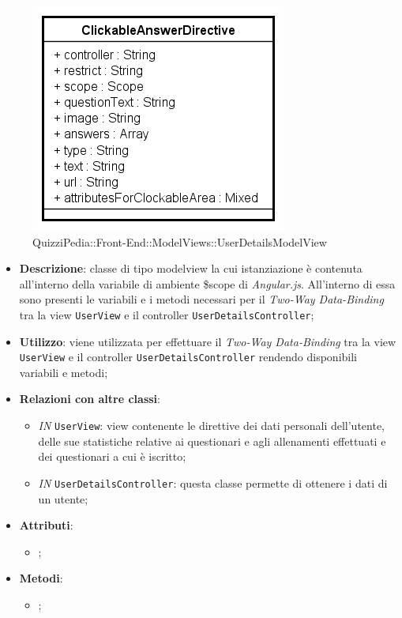 		\begin{figure}[ht]
			\centering
			\includegraphics[scale=0.5,keepaspectratio]{UML/Classi/Front-End/QuizziPedia_Front-end_Templates_ClickableAnswerTemplate.png}
			\caption{QuizziPedia::Front-End::ModelViews::UserDetailsModelView}
		\end{figure} \FloatBarrier
		
		\begin{itemize}
			\item \textbf{Descrizione}: classe di tipo modelview la cui istanziazione è contenuta all'interno della variabile di ambiente \$scope di \textit{Angular.js}. All'interno di essa sono presenti le variabili e i metodi necessari per il \textit{Two-Way Data-Binding} tra la view \texttt{UserView} e il controller \texttt{UserDetailsController};
			\item \textbf{Utilizzo}: viene utilizzata per effettuare il \textit{Two-Way Data-Binding} tra la view \texttt{UserView} e il controller \texttt{UserDetailsController} rendendo disponibili variabili e metodi;
			\item \textbf{Relazioni con altre classi}: 
			\begin{itemize}
				\item \textit{IN} \texttt{UserView}: view contenente le direttive dei dati personali dell'utente, delle sue statistiche relative ai questionari e agli allenamenti effettuati e dei questionari a cui è iscritto; 
				\item \textit{IN} \texttt{UserDetailsController}: questa classe permette di ottenere i dati di un utente;
			\end{itemize}
			\item \textbf{Attributi}: 
			\begin{itemize}
				\item ;
			\end{itemize}
			\item \textbf{Metodi}: 
			\begin{itemize}
				\item ;
			\end{itemize}
		\end{itemize}
		
